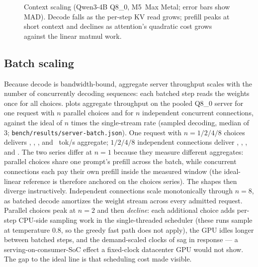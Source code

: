 \documentclass[sigconf,nonacm,screen]{acmart}
\newcommand{\code}[1]{\texttt{\small #1}}
\begin{document}
\begin{figure}[t]\centering
{}
\caption{Context scaling (Qwen3-4B Q8\_0, M5~Max Metal; error bars show
MAD). Decode falls as the per-step KV read grows; prefill peaks at short
context and declines as attention's quadratic cost grows against the
linear matmul work.}
\label{fig:ctx}
\end{figure}

\subsection{Batch scaling}
\label{sec:eval-batching}
Because decode is bandwidth-bound, aggregate server throughput scales with
the number of concurrently decoding sequences: each batched step reads the
weights once for all choices.  plots aggregate throughput on
the pooled Q8\_0 server for one request with $n$ parallel choices and for
$n$ independent concurrent connections, against the ideal of $n$ times the
single-stream rate (sampled decoding, median of 3;
\code{bench/results/server-batch.json}). One request with $n{=}1/2/4/8$ choices delivers
\BatchChoicesTpsOne, \BatchChoicesTpsTwo, \BatchChoicesTpsFour, and
\BatchChoicesTpsEight~tok/s aggregate; $1/2/4/8$ independent connections
deliver \BatchConnsTpsOne, \BatchConnsTpsTwo, \BatchConnsTpsFour, and
\BatchConnsTpsEight.
The two series differ at $n{=}1$ because they measure different
aggregates: parallel choices share one prompt's prefill across the batch,
while concurrent connections each pay their own prefill inside the
measured window (the ideal-linear reference is therefore anchored on the
choices series).
The shapes then diverge instructively. Independent connections scale
monotonically through $n{=}8$, as batched decode amortizes the weight
stream across every admitted request. Parallel
choices peak at $n{=}2$ and then \emph{decline}: each additional choice
adds per-step CPU-side sampling work in the single-threaded scheduler
(these runs sample at temperature $0.8$, so the greedy fast path does not
apply), the GPU idles longer between batched steps, and the demand-scaled
clocks of  sag in response --- a
serving-on-consumer-SoC effect a fixed-clock datacenter GPU would not show.
The gap to the ideal line is that scheduling cost made visible.
\end{document}
